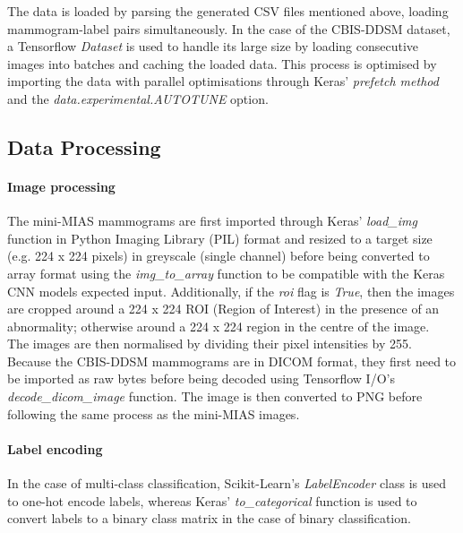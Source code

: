 The data is loaded by parsing the generated CSV files mentioned above, loading mammogram-label pairs simultaneously. In the case of the CBIS-DDSM dataset, a Tensorflow \textit{Dataset} is used to handle its large size by loading consecutive images into batches and caching the loaded data. This process is optimised by importing the data with parallel optimisations through Keras' \textit{prefetch method} and the \textit{data.experimental.AUTOTUNE} option.\\


\subsection{Data Processing}

\paragraph{Image processing} 

The mini-MIAS mammograms are first imported through Keras' \textit{load\_img} function in Python Imaging Library (PIL) format and resized to a target size (e.g. 224 x 224 pixels) in greyscale (single channel) before being converted to array format using the \textit{img\_to\_array} function to be compatible with the Keras CNN models expected input. Additionally, if the \textit{roi} flag is \textit{True}, then the images are cropped around a 224 x 224 ROI (Region of Interest) in the presence of an abnormality; otherwise around a 224 x 224 region in the centre of the image.\\

The images are then normalised by dividing their pixel intensities by 255. Because the CBIS-DDSM mammograms are in DICOM format, they first need to be imported as raw bytes before being decoded using Tensorflow I/O's \textit{decode\_dicom\_image} function. The image is then converted to PNG before following the same process as the mini-MIAS images.

\paragraph{Label encoding}

In the case of multi-class classification, Scikit-Learn's \textit{LabelEncoder} class is used to one-hot encode labels, whereas Keras' \textit{to\_categorical} function is used to convert labels to a binary class matrix in the case of binary classification.

